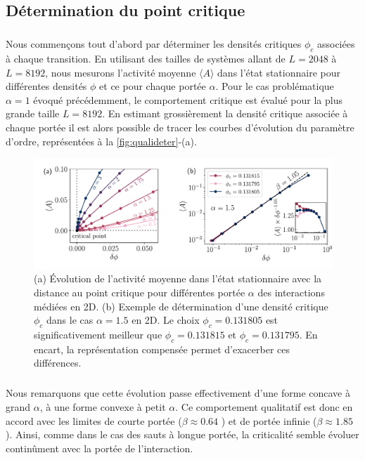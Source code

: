 \subsection{Détermination du point critique}

\subparagraph{}Nous commençons tout d'abord par déterminer les densités critiques $\phi_c$ associées à chaque transition. En utilisant des tailles de systèmes allant de $L=2048$ à $L=8192$, nous mesurons l'activité moyenne $\langle A \rangle$ dans l'état stationnaire pour différentes densités $\phi$ et ce pour chaque portée $\alpha$. Pour le cas problématique $\alpha=1$ évoqué précédemment, le comportement critique est évalué pour la plus grande taille $L=8192$. En estimant grossièrement la densité critique associée à chaque portée il est alors possible de tracer les courbes d'évolution du paramètre d'ordre, représentées à la \autoref{fig:qualideter}-(a).

\begin{figure}[h]
	\centering	\includegraphics[width=\textwidth]{Chapitre3/Figures/BetaGamma/EvolMeanDeter.pdf}
	\caption{(a) Évolution de l'activité moyenne dans l'état stationnaire avec la distance au point critique pour différentes portée $\alpha$ des interactions médiées en 2D. (b) Exemple de détermination d'une densité critique $\phi_c$ dans le cas $\alpha = 1.5$ en 2D. Le choix $\phi_c = 0.131805$ est significativement meilleur que $\phi_c = 0.131815$ et $\phi_c = 0.131795$. En encart, la représentation compensée permet d'exacerber ces différences.}
	\label{fig:qualideter}
\end{figure}

\subparagraph{}Nous remarquons que cette évolution passe effectivement d'une forme concave à grand $\alpha$, à une forme convexe à petit $\alpha$. Ce comportement qualitatif est donc en accord avec les limites de courte portée ($\beta  \approx 0.64$ \cite{lubeck_universal_2004}) et de portée infinie ($\beta\approx 1.85$ \cite{mari_absorbing_2022}). Ainsi, comme dans le cas des sauts à longue portée, la criticalité semble évoluer continûment avec la portée de l'interaction.

